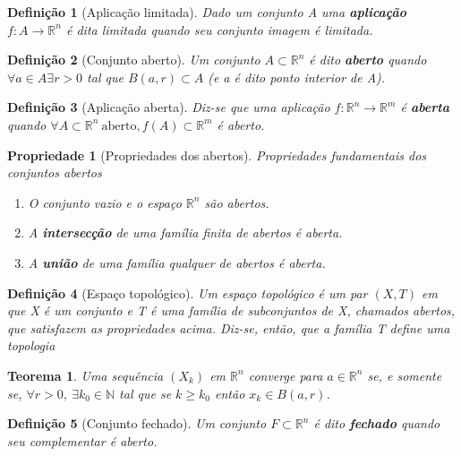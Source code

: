 \documentclass{article}
\newtheorem{prop}{Propriedade}
\newtheorem{theorem}{Teorema}
\newtheorem{definition}{Definição}
\begin{document}
\begin{definition}[Aplicação limitada]
Dado um conjunto A uma \textbf{aplicação} $f: A \rightarrow \mathbb{R}^n$ é dita limitada quando seu conjunto imagem é limitada.
\end{definition}

\begin{definition}[Conjunto aberto]
Um conjunto $A \subset \mathbb{R}^n$ é dito \textbf{aberto} quando $\forall a \in A \exists r > 0$ tal que $B(a, r) \subset A$ (e a é dito ponto interior de A).
\end{definition}

\begin{definition}[Aplicação aberta]
Diz-se que uma aplicação $f: \mathbb{R}^n \rightarrow \mathbb{R}^m$ é \textbf{aberta} quando $\forall A \subset \mathbb{R}^n\ \mathrm{aberto}, f(A) \subset \mathbb{R}^m$ é aberto.
\end{definition}

\begin{prop}[Propriedades dos abertos]
Propriedades fundamentais dos conjuntos abertos

\begin{enumerate}
    \item O conjunto vazio e o espaço $\mathbb{R}^n$ são abertos.
    
    \item A \textbf{intersecção} de uma família finita de abertos é aberta.
    
    \item A \textbf{união} de uma família qualquer de abertos é aberta.
\end{enumerate}
\end{prop}

\begin{definition}[Espaço topológico]
Um espaço topológico é um par $(X, T)$ em que X é um conjunto e T é uma família de subconjuntos de X, chamados abertos, que satisfazem as propriedades acima. Diz-se, então, que a família T define uma topologia
\end{definition}

\begin{theorem}
Uma sequência $(X_k)$ em $\mathbb{R}^n$ converge para $a \in \mathbb{R}^n$ se, e somente se, $\forall r > 0,\ \exists k_0 \in \mathbb{N}$ tal que se $k \geq k_0$ então $x_k \in B(a, r)$.
\end{theorem}

\begin{definition}[Conjunto fechado]
Um conjunto $F \subset \mathbb{R}^n$ é dito \textbf{fechado} quando seu complementar é aberto.
\end{definition}
\end{document}
